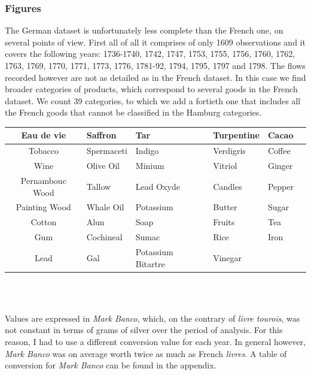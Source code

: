 \documentclass[12pt,a4paper,titlepage]{article}
\begin{document}
\subsubsection{Figures}
The German dataset is unfortunately less complete than the French one, on several points of view. First all of all it comprises of only 1609 observations and it covers the following years: 1736-1740, 1742, 1747, 1753, 1755, 1756, 1760, 1762, 1763, 1769, 1770, 1771, 1773, 1776, 1781-92, 1794, 1795, 1797 and 1798. The flows recorded however are not as detailed as in the French dataset. In this case we find broader categories of products, which correspond to several goods in the French dataset. We count 39 categories, to which we add a fortieth one that includes all the French goods that cannot be classified in the Hamburg categories. 
\begin{center}
 \label{tab:title} 
\begin{tabularx}{1\textwidth}{|c *{5}{|Y}|}
\hline
	Eau de vie & Saffron & Tar & Turpentine & Cacao \\ \hline
	Tobacco & Spermaceti & Indigo & Verdigris & Coffee \\ \hline
	Wine & Olive Oil & Minium  & Vitriol & Ginger \\ \hline
	Pernambouc Wood & Tallow & Lead Oxyde & Candles & Pepper \\ \hline
	Painting Wood & Whale Oil & Potassium & Butter & Sugar \\ \hline
	Cotton & Alun & Soap & Fruits & Tea \\ \hline
	Gum & Cochineal & Sumac & Rice & Iron \\ \hline
	Lead & Gal & Potassium Bitartre & Vinegar & \  \\ \hline
\end{tabularx}\\~\\
\end{center}

Values are expressed in \textit{Mark Banco}, which, on the contrary of \textit{livre tourois}, was not constant in terms of grams of silver over the period of analysis. For this reason, I had to use a different conversion value for each year. In general however, \textit{Mark Banco} was on average worth twice as much as French \textit{livres}. A table of conversion for \textit{Mark Banco} can be found in the appendix. \\
\end{document}
